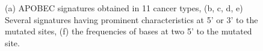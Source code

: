 \documentclass{article}
\begin{document}
\begin{figure}
\quad
{}
    

\caption{(a) APOBEC signatures obtained in 11 cancer types, 
(b, c, d, e) Several signatures having prominent characteristics at 5'  or 3' to the mutated sites,
(f) the frequencies of bases at two 5' to the mutated site. 
}
\label{nature2013_apobec}
\end{figure}

\clearpage
\end{document}
